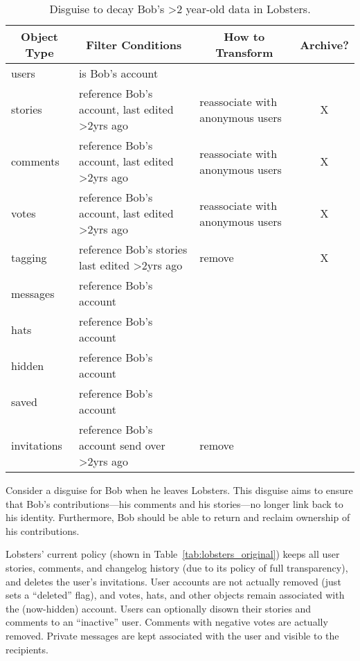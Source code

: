 \begin{table*}[t!]
\begin{tabular}{@{}l|l|l|c@{}}
    \multicolumn{1}{c}{\textbf{Object Type}} & 
    \multicolumn{1}{c}{\textbf{Filter Conditions}} &
    \multicolumn{1}{c}{\textbf{How to Transform}}  &
    \multicolumn{1}{c}{\textbf{Archive?}} \\ 
    \hline
    users & is Bob's account & & \\
    stories & reference Bob's account, last edited >2yrs ago& reassociate with anonymous users & X\\
    comments & reference Bob's account, last edited >2yrs ago & reassociate with anonymous users & X\\
    votes & reference Bob's account, last edited >2yrs ago & reassociate with anonymous users & X\\
    tagging & reference Bob's stories last edited >2yrs ago & remove & X \\
    messages & reference Bob's account & & \\
    hats & reference Bob's account & & \\
    hidden & reference Bob's account & & \\
    saved & reference Bob's account & & \\
    invitations & reference Bob's account send over >2yrs ago & remove & \\
\end{tabular}
    \caption{Disguise to decay Bob's >2 year-old data in Lobsters.}
    \label{tab:lobsters_partial}
\end{table*}

Consider a disguise for Bob when he leaves Lobsters. 
%
This disguise aims to ensure that Bob's contributions---his comments
and his stories---no longer link back to his identity. Furthermore, Bob should be able to return and
reclaim ownership of his contributions.

Lobsters' current policy (shown in Table~\ref{tab:lobsters_original}) keeps all user stories,
comments, and changelog history (due to its policy of full transparency), and deletes the user's
invitations. User accounts are not actually removed (just sets a ``deleted'' flag), and votes, hats,
and other objects remain associated with the (now-hidden) account. Users can optionally disown their
stories and comments to an ``inactive'' user. Comments with negative votes are actually removed.
Private messages are kept associated with the user and visible to the recipients.


